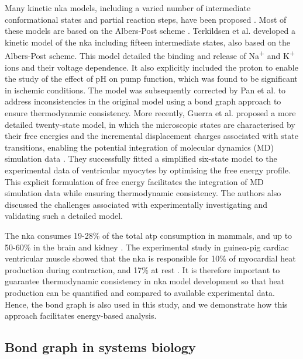 \documentclass{biophys-new}
\newcommand{\rev}[1]{{\color{black} #1}}
\begin{document}
Many kinetic \Gls{nka} models, including a varied number of intermediate conformational states and partial reaction steps, have been proposed \cite{post_flexibility_1969,karlish_conformational_1978,glynn_na_1985, apell_electrogenic_1989,terkildsen_balance_2007,guerra_multistate_2025}.
Most of these models are based on the Albers-Post scheme \cite{albers_role_1963,post_activation_1972}.
Terkildsen et al. \cite{terkildsen_balance_2007} developed a kinetic model of the \Gls{nka} including fifteen intermediate states, also based on the Albers-Post scheme.
This model detailed the binding and release of Na\textsuperscript{+} and K\textsuperscript{+} ions and their voltage dependence.
It also explicitly included the proton to enable the study of the effect of pH on pump function,
which was found to be significant in ischemic conditions.
The model was subsequently corrected by Pan et al. \cite{pan_cardiac_2020} to address inconsistencies in the original model using a bond graph approach to ensure thermodynamic consistency. \rev{More recently, Guerra et al. \cite{guerra_multistate_2025} proposed a more detailed twenty-state model, in which the microscopic states are characterised by their free energies and the incremental displacement charges associated with state transitions, enabling the potential integration of molecular dynamics (MD) simulation data \cite{roux2008membrane}. They successfully fitted a simplified six-state model to the experimental data of ventricular myocytes \cite{nakao1989and} by optimising the free energy profile. This explicit formulation of free energy facilitates the integration of MD simulation data while ensuring thermodynamic consistency. The authors also discussed the challenges associated with experimentally investigating and validating such a detailed model.}

The \Gls{nka} consumes 19-28\% of the total \gls{atp} consumption in mammals, and up to 50-60\% in the brain and kidney \cite{rolfe_cellular_1997}.
The experimental study in guinea-pig cardiac ventricular muscle showed that the \Gls{nka} is responsible for 10\% of myocardial heat production during contraction, and 17\% at rest \cite{schramm1994energy}.
It is therefore important to guarantee thermodynamic consistency in \Gls{nka} model development so that heat production can be quantified and compared to available experimental data. Hence, the bond graph is also used in this study, and we demonstrate how this approach facilitates energy-based analysis.

\subsection*{Bond graph in systems biology}
\end{document}
